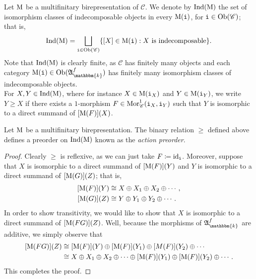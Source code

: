 \noindent Let $\textup{M}$ be a multifinitary birepresentation of $\mathscr{C}$. We denote by $\textup{Ind}(\textup{M})$ the set of isomorphism classes of indecomposable objects in every $\textup{M}(\textup{\texttt{i}})$, for $\textup{\texttt{i}} \in \textup{Ob}(\mathscr{C})$; that is,
\begin{align*}
\begin{split}
\textup{Ind}(\textup{M}) = \bigsqcup_{\textup{\texttt{i}} \in \textup{Ob}(\mathscr{C})} \{[X] \in \textup{M}(\textup{\texttt{i}}) : \textup{$X$ is indecomposable}\}.
\end{split}
\end{align*}
\noindent Note that $\textup{Ind}(\textup{M})$ is clearly finite, as $\mathscr{C}$ has finitely many objects and each category $\textup{M}(\textobj{i}) \in \obset(\mathfrak{A}_\mathbbm{k}^f)$ has finitely many isomorphism classes of indecomposable objects.\\

\noindent For $X, Y \in \textup{Ind}(\textup{M})$, where for instance $X \in \textup{M}(\textup{\texttt{i}}_X)$ and $Y \in \textup{M}(\textup{\texttt{i}}_Y)$, we write $Y \geq X$ if there exists a $1$-morphism $F \in \textup{Mor}_\mathscr{C}^1(\textup{\texttt{i}}_X, \textup{\texttt{i}}_Y)$ such that $Y$ is isomorphic to a direct summand of $[\textup{M}(F)](X)$.\\

\noindent\begin{lemma}\label{ActionPreorder} Let $\textup{M}$ be a multifinitary birepresentation. The binary relation $\geq$ defined above defines a preorder on $\textup{Ind}(\textup{M})$ known as the {\em action preorder}.\\
\end{lemma}

\noindent\begin{proof} Clearly $\geq$ is reflexive, as we can just take $F \coloneqq \textup{id}_{\textup{\texttt{i}}}$. Moreover, suppose that $X$ is isomorphic to a direct summand of $[\textup{M}(F)](Y)$ and $Y$ is isomorphic to a direct summand of $[\textup{M}(G)](Z)$; that is,
\begin{align*}
\begin{split}
[\textup{M}(F)](Y) &\cong X \oplus X_1 \oplus X_2 \oplus \cdots,\\
[\textup{M}(G)](Z) &\cong Y \oplus Y_1 \oplus Y_2 \oplus \cdots.
\end{split}
\end{align*}
\noindent In order to show transitivity, we would like to show that $X$ is isomorphic to a direct summand of $[\textup{M}(FG)](Z)$. Well, because the morphisms of $\mathfrak{A}_\mathbbm{k}^f$ are additive, we simply observe that
\begin{align*}
\begin{split}
[\textup{M}(FG)](Z) &\cong [\textup{M}(F)](Y) \oplus [\textup{M}(F)](Y_1) \oplus [M(F)](Y_2) \oplus \cdots\\
&\cong X \oplus X_1 \oplus X_2 \oplus \cdots \oplus [\textup{M}(F)](Y_1) \oplus [\textup{M}(F)](Y_2) \oplus \cdots.
\end{split}
\end{align*}
\noindent This completes the proof.
\end{proof}\\


